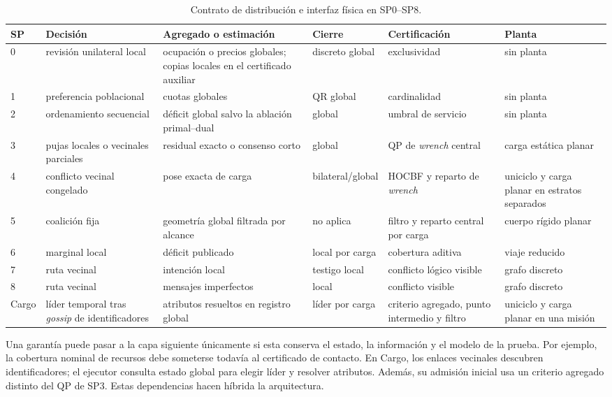 \begin{table}[!htbp]
 \centering
 \caption{Contrato de distribución e interfaz física en SP0--SP8.}
 \label{tab:results-model-map}
 \scriptsize
 \setlength{\tabcolsep}{2.2pt}
 \renewcommand{\arraystretch}{1.08}
 \begin{tabularx}{\textwidth}{@{}p{0.70cm}p{2.35cm}p{2.70cm}p{2.20cm}p{2.45cm}X@{}}
  \toprule
  SP & Decisión & Agregado o estimación & Cierre & Certificación & Planta \\
  \midrule
  0 & revisión unilateral local & ocupación o precios globales; copias locales en el certificado auxiliar & discreto global & exclusividad & sin planta \\
  1 & preferencia poblacional & cuotas globales & QR global & cardinalidad & sin planta \\
  2 & ordenamiento secuencial & déficit global salvo la ablación primal--dual & global & umbral de servicio & sin planta \\
  3 & pujas locales o vecinales parciales & residual exacto o consenso corto & global & QP de \emph{wrench} central & carga estática planar \\
  4 & conflicto vecinal congelado & pose exacta de carga & bilateral/global & HOCBF y reparto de \emph{wrench} & uniciclo y carga planar en estratos separados \\
  5 & coalición fija & geometría global filtrada por alcance & no aplica & filtro y reparto central por carga & cuerpo rígido planar \\
  6 & marginal local & déficit publicado & local por carga & cobertura aditiva & viaje reducido \\
  7 & ruta vecinal & intención local & testigo local & conflicto lógico visible & grafo discreto \\
  8 & ruta vecinal & mensajes imperfectos & local & conflicto visible & grafo discreto \\
  Cargo & líder temporal tras \emph{gossip} de identificadores & atributos resueltos en registro global & líder por carga & criterio agregado, punto intermedio y filtro & uniciclo y carga planar en una misión \\
  \bottomrule
 \end{tabularx}
 \viuownsource
\end{table}

Una garantía puede pasar a la capa siguiente únicamente si esta conserva el estado, la información y el modelo de la prueba. Por ejemplo, la cobertura nominal de recursos debe someterse todavía al certificado de contacto. En Cargo, los enlaces vecinales descubren identificadores; el ejecutor consulta estado global para elegir líder y resolver atributos. Además, su admisión inicial usa un criterio agregado distinto del QP de SP3. Estas dependencias hacen híbrida la arquitectura.


